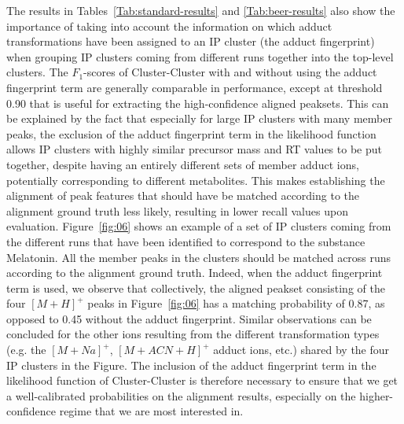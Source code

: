 The results in Tables~\ref{Tab:standard-results} and \ref{Tab:beer-results} also show the importance of taking into account the information on which adduct transformations have been assigned to an IP cluster (the adduct fingerprint) when grouping IP clusters coming from different runs together into the top-level clusters. The $F_1$-scores of Cluster-Cluster with and without using the adduct fingerprint term are generally comparable in performance, except at threshold 0.90 that is useful for extracting the high-confidence aligned peaksets. This can be explained by the fact that especially for large IP clusters with many member peaks, the exclusion of the adduct fingerprint term in the likelihood function allows IP clusters with highly similar precursor mass and RT values to be put together, despite having an entirely different sets of member adduct ions, potentially corresponding to different metabolites. This makes establishing the alignment of peak features that should have be matched according to the alignment ground truth less likely, resulting in lower recall values upon evaluation. Figure~\ref{fig:06} shows an example of a set of IP clusters coming from the different runs that have been identified to correspond to the substance Melatonin. All the member peaks in the clusters should be matched across runs according to the alignment ground truth. Indeed, when the adduct fingerprint term is used, we observe that collectively, the aligned peakset consisting of the four $[M+H]^+$ peaks in Figure~\ref{fig:06} has a matching probability of 0.87, as opposed to 0.45 without the adduct fingerprint. Similar observations can be concluded for the other ions resulting from the different transformation types (e.g. the $[M+Na]^+$, $[M+ACN+H]^+$ adduct ions, etc.) shared by the four IP clusters in the Figure. The inclusion of the adduct fingerprint term in the likelihood function of Cluster-Cluster is therefore necessary to ensure that we get a well-calibrated probabilities on the alignment results, especially on the higher-confidence regime that we are most interested in. 

